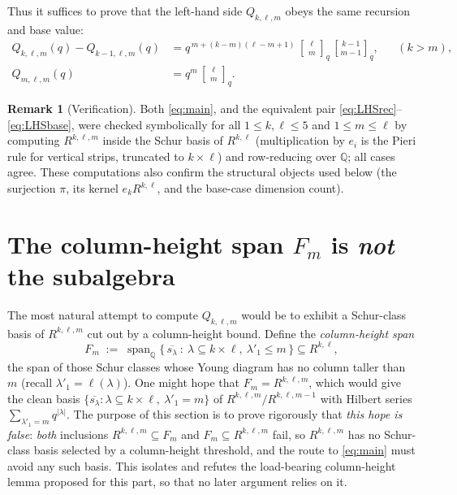 \documentclass{amsart}
\theoremstyle{definition}
\newtheorem{remark}{Remark}
\newcommand{\qbin}[2]{\genfrac{[}{]}{0pt}{}{#1}{#2}_q}
\newcommand{\Q}{\mathbb{Q}}
\newcommand{\rkl}{R^{k,\ell}}
\newcommand{\Rklm}{R^{k,\ell,m}}
\begin{document}
Thus it suffices to prove that the left-hand side $Q_{k,\ell,m}$ obeys the same
recursion and base value:
\begin{align}
\label{eq:LHSrec}
Q_{k,\ell,m}(q)-Q_{k-1,\ell,m}(q)
&= q^{\,m+(k-m)(\ell-m+1)}\,\qbin{\ell}{m}\,\qbin{k-1}{m-1},
&&(k>m),\\
\label{eq:LHSbase}
Q_{m,\ell,m}(q)&=q^{m}\,\qbin{\ell}{m}.
\end{align}

\begin{remark}[Verification]\label{rem:verif}
Both \eqref{eq:main}, and the equivalent pair \eqref{eq:LHSrec}--\eqref{eq:LHSbase},
were checked symbolically for all $1\le k,\ell\le5$ and $1\le m\le\ell$ by computing
$\Rklm$ inside the Schur basis of $\rkl$ (multiplication by $e_i$ is the Pieri rule
for vertical strips, truncated to $k\times\ell$) and row-reducing over $\Q$; all
cases agree. These computations also confirm the structural objects used below
(the surjection $\pi$, its kernel $e_k\rkl$, and the base-case dimension count).
\end{remark}

\section{The column-height span $F_m$ is \emph{not} the subalgebra}
\label{sec:Fm}

The most natural attempt to compute $Q_{k,\ell,m}$ would be to exhibit a
Schur-class basis of $\Rklm$ cut out by a column-height bound. Define the
\emph{column-height span}
\[
F_m \;:=\; \operatorname{span}_{\Q}\bigl\{\,\overline{s_\lambda}\ :\
\lambda\subseteq k\times\ell,\ \lambda'_1\le m\,\bigr\}\subseteq\rkl ,
\]
the span of those Schur classes whose Young diagram has no column taller than $m$
(recall $\lambda'_1=\ell(\lambda)$). One might hope that $F_m=\Rklm$, which would
give the clean basis $\{\overline{s_\lambda}:\lambda\subseteq k\times\ell,\
\lambda'_1=m\}$ of $\Rklm/R^{k,\ell,m-1}$ with Hilbert series
$\sum_{\lambda'_1=m}q^{|\lambda|}$. The purpose of this section is to prove rigorously
that \emph{this hope is false}: \emph{both} inclusions $\Rklm\subseteq F_m$ and
$F_m\subseteq\Rklm$ fail, so $\Rklm$ has no Schur-class basis selected by a
column-height threshold, and the route to \eqref{eq:main} must avoid any such basis.
This isolates and refutes the load-bearing column-height lemma proposed for this part,
so that no later argument relies on it.
\end{document}
